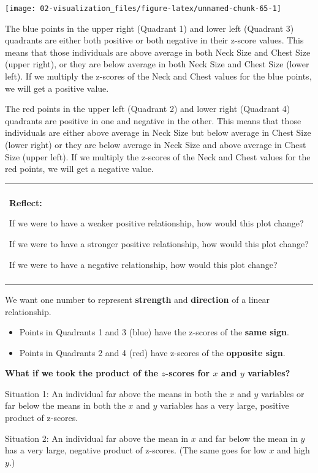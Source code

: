 \documentclass[
]{book}
\providecommand{\tightlist}{%
  \setlength{\itemsep}{0pt}\setlength{\parskip}{0pt}}
\newenvironment{reflect}
{
    \begin{center}
    
    \begin{tabular}{|p{0.8\textwidth}|}
    \rowcolor{LightBlue}
    \hline\\
    \rowcolor{LightBlue}
    \textbf{Reflect:}
}
{
    \\\rowcolor{LightBlue}
    \\\hline
    \end{tabular} 
    \end{center}
}
\begin{document}
\begin{center}\texttt{[image: 02-visualization\_files/figure-latex/unnamed-chunk-65-1]} \end{center}

The blue points in the upper right (Quadrant 1) and lower left (Quadrant 3) quadrants are either both positive or both negative in their z-score values. This means that those individuals are above average in both Neck Size and Chest Size (upper right), or they are below average in both Neck Size and Chest Size (lower left). If we multiply the z-scores of the Neck and Chest values for the blue points, we will get a positive value.

The red points in the upper left (Quadrant 2) and lower right (Quadrant 4) quadrants are positive in one and negative in the other. This means that those individuals are either above average in Neck Size but below average in Chest Size (lower right) or they are below average in Neck Size and above average in Chest Size (upper left). If we multiply the z-scores of the Neck and Chest values for the red points, we will get a negative value.

\begin{reflect}
If we were to have a weaker positive relationship, how would this plot
change?

If we were to have a stronger positive relationship, how would this plot
change?

If we were to have a negative relationship, how would this plot change?
\end{reflect}

We want one number to represent \textbf{strength} and \textbf{direction} of a linear relationship.

\begin{itemize}
\tightlist
\item
  Points in Quadrants 1 and 3 (blue) have the z-scores of the \textbf{same sign}.
\item
  Points in Quadrants 2 and 4 (red) have z-scores of the \textbf{opposite sign}.
\end{itemize}

\textbf{What if we took the product of the \(z\)-scores for \(x\) and \(y\) variables?}

Situation 1: An individual far above the means in both the \(x\) and \(y\) variables or far below the means in both the \(x\) and \(y\) variables has a very large, positive product of z-scores.

Situation 2: An individual far above the mean in \(x\) and far below the mean in \(y\) has a very large, negative product of z-scores. (The same goes for low \(x\) and high \(y\).)
\end{document}
